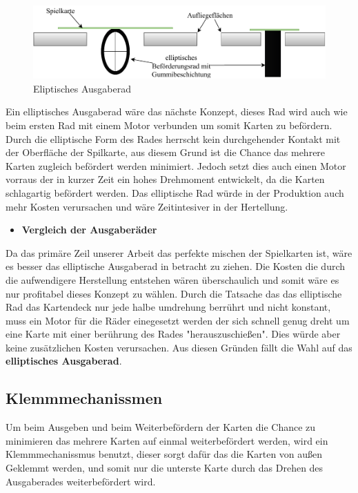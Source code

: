 \begin{figure}[H]
    \centering
    \includegraphics[scale=0.5,page=1]{fig/mech/ElliptischesAusgaberad}
    \caption{Eliptisches Ausgaberad}
\end{figure}


        Ein elliptisches Ausgaberad wäre das nächste Konzept, dieses Rad wird auch wie beim ersten Rad mit einem Motor verbunden um somit Karten zu befördern.
        Durch die elliptische Form des Rades herrscht kein durchgehender Kontakt mit der Oberfläche der Spilkarte, aus diesem Grund ist die Chance das mehrere
        Karten zugleich befördert werden minimiert. Jedoch setzt dies auch einen Motor vorraus der in kurzer Zeit ein hohes Drehmoment entwickelt, da die
        Karten schlagartig befördert werden. Das elliptische Rad würde in der Produktion auch mehr Kosten verursachen und wäre Zeitintesiver in der Hertellung. \\

\begin{itemize}
    \item \textbf{Vergleich der Ausgaberäder}
\end{itemize}

Da das primäre Zeil unserer Arbeit das perfekte mischen der Spielkarten ist, wäre es besser das elliptische Ausgaberad in betracht zu ziehen. Die Kosten
 die durch die aufwendigere Herstellung entstehen wären überschaulich und somit wäre es nur profitabel dieses Konzept zu wählen. Durch die Tatsache das das elliptische Rad
das Kartendeck nur jede halbe umdrehung berrührt und nicht konstant, muss ein Motor für die Räder einegesetzt werden der sich schnell genug dreht um eine Karte mit einer berührung
des Rades "herauszuschießen". Dies würde aber keine zusätzlichen Kosten verursachen. Aus diesen Gründen fällt die Wahl auf das \textbf{elliptisches Ausgaberad}. \\

\subsection{Klemmmechanissmen}
Um beim Ausgeben und beim Weiterbefördern der Karten die Chance zu minimieren das mehrere Karten auf einmal weiterbefördert werden, wird ein
Klemmmechanissmus benutzt, dieser sorgt dafür das die Karten von außen Geklemmt werden, und somit nur die unterste Karte durch das Drehen des
Ausgaberades weiterbefördert wird.

